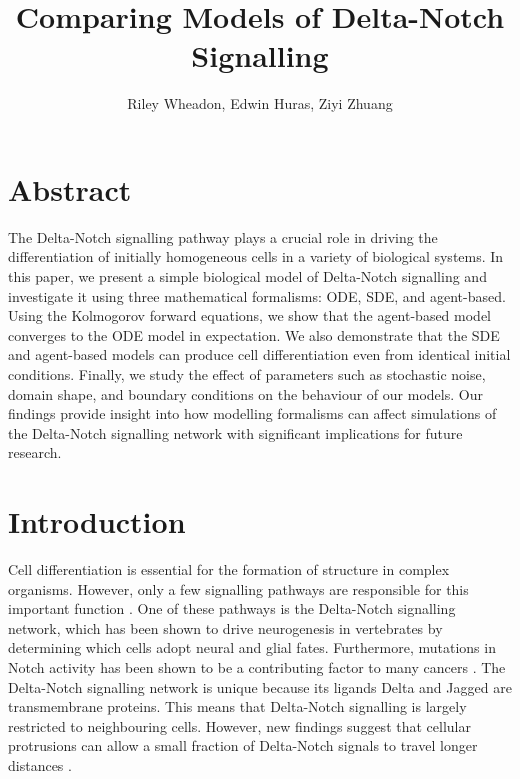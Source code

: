 \documentclass{article}
\title{Comparing Models of Delta-Notch Signalling}
\author{Riley Wheadon, Edwin Huras, Ziyi Zhuang}
\begin{document}
\maketitle

\section*{Abstract}

The Delta-Notch signalling pathway plays a crucial role in driving the differentiation of initially homogeneous cells in a variety of biological systems.
In this paper, we present a simple biological model of Delta-Notch signalling and investigate it using three mathematical formalisms: ODE, SDE, and agent-based.
Using the Kolmogorov forward equations, we show that the agent-based model converges to the ODE model in expectation.
We also demonstrate that the SDE and agent-based models can produce cell differentiation even from identical initial conditions.
Finally, we study the effect of parameters such as stochastic noise, domain shape, and boundary conditions on the behaviour of our models.
Our findings provide insight into how modelling formalisms can affect simulations of the Delta-Notch signalling network with significant implications for future research. 

\section*{Introduction}

Cell differentiation is essential for the formation of structure in complex organisms.
However, only a few signalling pathways are responsible for this important function \cite{bray_notch_2006}.
One of these pathways is the Delta-Notch signalling network, which has been shown to drive neurogenesis in vertebrates by determining which cells adopt neural and glial fates. 
Furthermore, mutations in Notch activity has been shown to be a contributing factor to many cancers \cite{bray_notch_2006}.
The Delta-Notch signalling network is unique because its ligands Delta and Jagged are transmembrane proteins.
This means that Delta-Notch signalling is largely restricted to neighbouring cells. 
However, new findings suggest that cellular protrusions can allow a small fraction of Delta-Notch signals to travel longer distances \cite{berkemeier_coupling_2023}.
\end{document}
